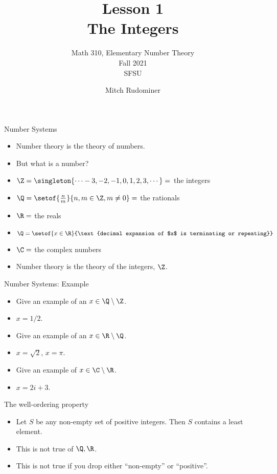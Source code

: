 \documentclass[handout]{beamer}
\title{Lesson 1 \\ The Integers}
\subtitle{Math 310, Elementary Number Theory \\ Fall 2021 \\ SFSU}
\author{Mitch Rudominer}
\date{}
\begin{document}
\begin{frame}
  \titlepage
\end{frame}


\begin{frame}{Number Systems}

  \begin{itemize}
  \item Number theory is the theory of numbers.
  \item But what is a number?
  \item $\Z = \singleton{\cdots -3,-2,-1,0,1,2,3,\cdots} = $ the integers
  \item $\Q = \setof{\frac{n}{m}}{n,m\in \Z, m\not= 0} = $ the rationals
  \item $\R = $ the reals
  \item $\Q = \setof{x\in\R}{\text{decimal expansion of $x$ is terminating or repeating}}$
  \item $\C = $ the complex numbers
  \item Number theory is the theory of the integers, $\Z$.
  \end{itemize}


\end{frame}

\begin{frame}{Number Systems: Example}
\begin{itemize}
  \item  Give an example of an $x\in \Q \setminus \Z$.
  \item $x=1/2$.
  \item  Give an example of an $x\in \R \setminus \Q$.
  \item $x=\sqrt{2}$, $x=\pi$.
  \item Give an example of $x\in\C \setminus \R$.
  \item $x=2i+3$.
  \end{itemize}
\end{frame}

\begin{frame}{The well-ordering property}

\begin{itemize}
  \item Let $S$ be any non-empty set of positive integers. Then $S$ contains
  a least element.
  \item This is not true of $\Q,\R$.
  \item This is not true if you drop either ``non-empty'' or ``positive''.
\end{itemize}

\end{frame}
\end{document}
